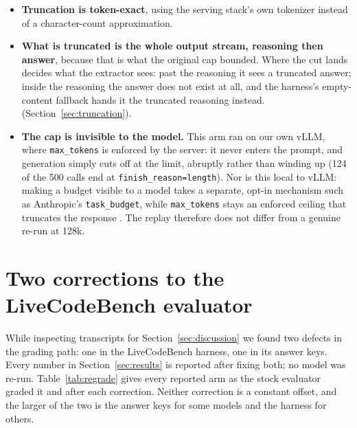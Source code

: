 \documentclass{article}
\begin{document}
\begin{itemize}
  \item \textbf{Truncation is token-exact}, using the serving stack's own tokenizer instead of a
  character-count approximation.

  \item \textbf{What is truncated is the whole output stream, reasoning then answer}, because that
  is what the original cap bounded. Where the cut lands decides what the extractor sees: past the
  reasoning it sees a truncated answer; inside the reasoning the answer does not exist at all, and
  the harness's empty-content fallback hands it the truncated reasoning instead. (Section~\ref{sec:truncation}).

  \item \textbf{The cap is invisible to the model.} This arm
  ran on our own vLLM, where \texttt{max\_tokens} is enforced by the server: it never enters the
  prompt, and generation simply cuts off at the limit, abruptly rather than winding up (124 of the
  500 calls end at \texttt{finish\_reason=length}). Nor is this local to vLLM: making a
  budget visible to a model takes a separate, opt-in mechanism such as Anthropic's
  \texttt{task\_budget}, while \texttt{max\_tokens} stays an enforced ceiling that truncates the
  response \citep{anthropic2026effort}. The replay therefore does not differ from a genuine re-run
  at 128k.
\end{itemize}

\section{Two corrections to the LiveCodeBench evaluator}
\label{app:evaluator}

While inspecting transcripts for Section~\ref{sec:discussion} we found two defects in the grading
path: one in the LiveCodeBench harness, one in its answer keys. Every number in
Section~\ref{sec:results} is reported after fixing both; no model was re-run.
Table~\ref{tab:regrade} gives every reported arm as the stock evaluator graded it and after each
correction. Neither correction is a constant offset, and the larger of the two is the answer keys
for some models and the harness for others.
\end{document}
